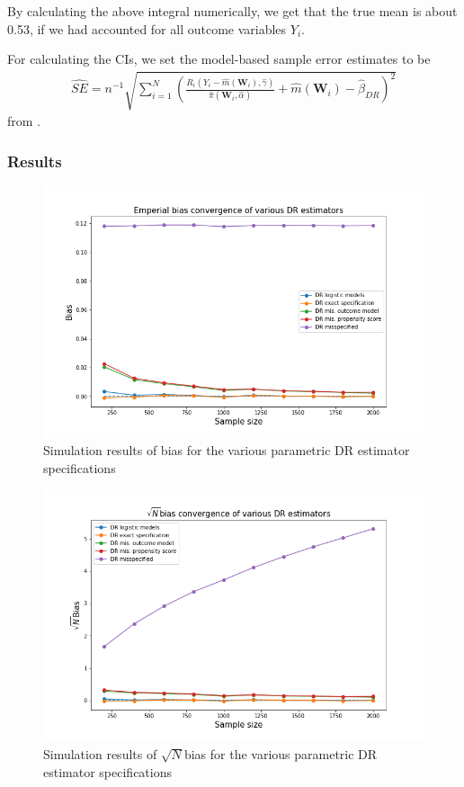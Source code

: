 \documentclass[12pt,twoside]{article}
\begin{document}
By calculating the above integral numerically, we get that the true mean is about 0.53, if we had accounted for all outcome variables $Y_i$.

For calculating the CIs, we set the model-based sample error estimates to be 
\begin{align*}
    \hat{SE} = n^{-1} \sqrt{\sum_{i=1}^N \left(\frac{R_i(Y_i - \hat m(\mathbf{W}_i), \hat \gamma)}{\hat\pi(\mathbf{W}_i,\hat\alpha)} + \hat m(\mathbf{W}_i) - \hat{\beta}_{DR}\right)^2}  
\end{align*}
from \citet{lunceford_davidian}. \\

\subsubsection*{Results}

\begin{figure}[h!]
    \centering
    \includegraphics[width = 0.9\columnwidth]{figures/biaspara.png}
    \caption{Simulation results of bias for the various parametric DR estimator specifications}
    \label{figbiaspara}
\end{figure}

\begin{figure}[h!]
    \centering
    \includegraphics[width = 0.9\columnwidth]{figures/sqrtnpara.png}
    \caption{Simulation results of $\sqrt{N}$bias for the various parametric DR estimator specifications}
    \label{figsqrtnpara}
\end{figure}
\end{document}
